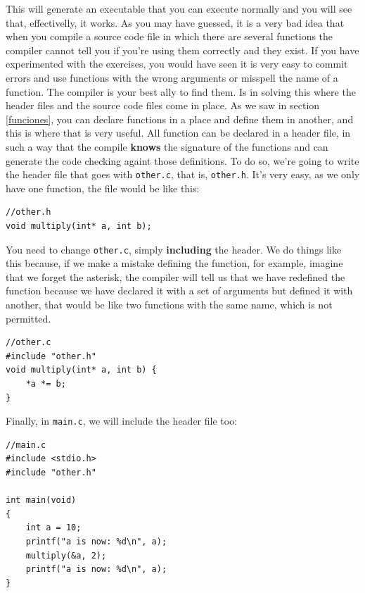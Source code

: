 \documentclass[a4paper]{article}
\begin{document}
This will generate an executable that you can execute normally and you will see
that, effectivelly, it works. As you may have guessed, it is a very bad idea
that when you compile a source code file in which there are several functions
the compiler cannot tell you if you're using them correctly and they exist.
If you have experimented with the exercises, you would have seen it is very easy
to commit errors and use functions with the wrong arguments or misspell the name
of a function. The compiler is your best ally to find them. Is in solving this
where the header files and the source code files come in place. As we saw in
section \ref{funciones}, you can declare functions in a place and define them in
another, and this is where that is very useful. All function can be declared in
a header file, in such a way that the compile \textbf{knows} the signature of
the functions and can generate the code checking againt those definitions.
To do so, we're going to write the header file that goes with \verb!other.c!,
that is, \verb!other.h!. It's very easy, as we only have one function, the file
would be like this:

\noindent
\begin{minipage}[H]{\linewidth}
\mbox{}
\begin{lstlisting}[style=C,
caption={Header file},
label={lst:headerFile}]
//other.h
void multiply(int* a, int b);
\end{lstlisting}
\end{minipage}

You need to change \verb!other.c!, simply \textbf{including} the header. We do
things like this because, if we make a mistake defining the function, for
example, imagine that we forget the asterisk, the compiler will tell us that
we have redefined the function because we have declared it with a set of
arguments but defined it with another, that would be like two functions with
the same name, which is not permitted.

\noindent
\begin{minipage}[H]{\linewidth}
\mbox{}
\begin{lstlisting}[style=C,
caption={Definition file with included header},
label={lst:fileCofHeader}]
//other.c
#include "other.h"
void multiply(int* a, int b) {
    *a *= b;
}
\end{lstlisting}
\end{minipage}

Finally, in \verb!main.c!, we will include the header file too:

\noindent
\begin{minipage}[H]{\linewidth}
\mbox{}
\begin{lstlisting}[style=C,
caption={Main file with included headers},
label={lst:fileCofHeader}]
//main.c
#include <stdio.h>
#include "other.h"

int main(void)
{
    int a = 10;
    printf("a is now: %d\n", a);
    multiply(&a, 2);
    printf("a is now: %d\n", a);
}
\end{lstlisting}
\end{minipage}
\end{document}
